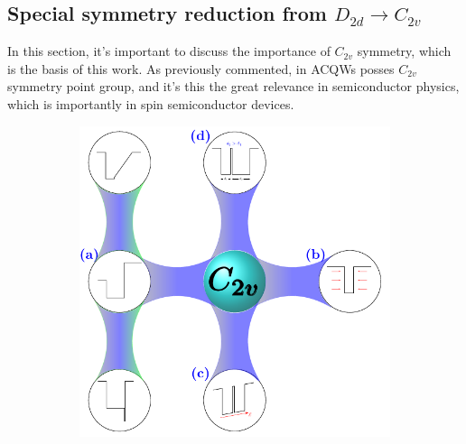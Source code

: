 \subsection{Special symmetry reduction from $D_{2d}\to C_{2v}$}
\label{subsubsec:chapter-2-special-symmetry}
\vspace{-10mm} 
In this section, it's important to discuss the importance of $C_{2v}$ symmetry, which is the basis of this work. As previously commented, in \gls{ACQWs} posses $C_{2v}$ symmetry point group, and it's this the great relevance in semiconductor physics, which is importantly in spin semiconductor devices. \cite{andrada1997spin,luo2015supercoupling,ivchenko2008spinphoto,glazov2018electron,winkler2003spin,ohrmann2004anomalousspin}



\begin{figure}
	\centering
	\begin{subfigure}{\textwidth}
		\includegraphics[width=\textwidth]{../figures/chapter-2/symmetry/out/roadmap}
		\label{subfig:subsubsec:chapter-2-roadmap-a}
		\label{subfig:subsubsec:chapter-2-roadmap-b}
		\label{subfig:subsubsec:chapter-2-roadmap-c}
		\label{subfig:subsubsec:chapter-2-roadmap-d}
	\end{subfigure}
	\caption
	{
}
\end{figure}
